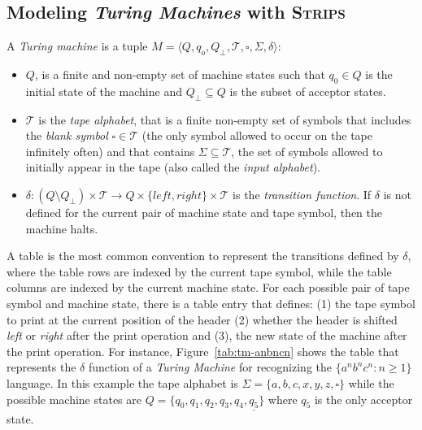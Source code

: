 \documentclass[letterpaper]{article} %
\newcommand{\tup}[1]{{\langle #1 \rangle}}
\newcommand{\strips}{\textsc{Strips}}     %
\begin{document}
\subsection{Modeling {\em Turing Machines} with \strips\ }
A {\em Turing machine} is a tuple $M=\tup{Q,q_o,Q_{\bot},\mathcal{T},\square,\Sigma,\delta}$:
\begin{itemize}
\item $Q$, is a finite and non-empty set of machine states such that $q_0\in Q$ is the initial state of the machine and $Q_{\bot}\subseteq Q$ is the subset of acceptor states.  
\item $\mathcal{T}$ is the {\em tape alphabet}, that is a finite non-empty set of symbols that includes the {\em blank symbol} $\square\in\mathcal{T}$ (the only symbol allowed to occur on the tape infinitely often) and that contains $\Sigma\subseteq\mathcal{T}$, the set of symbols allowed to initially appear in the tape (also called the {\em input alphabet}).
\item $\delta: (Q\setminus Q_{\bot})\times \mathcal{T}\rightarrow Q\times\{left,right\}\times \mathcal{T}$ is the {\em transition function}. If $\delta$ is not defined for the current pair of machine state and tape symbol, then the machine halts.
\end{itemize}

A table is the most common convention to represent the transitions defined by $\delta$, where the table rows are indexed by the current tape symbol, while the table columns are indexed by the current machine state. For each possible pair of tape symbol and machine state, there is a table entry that defines: (1) the tape symbol to print at the current position of the header (2) whether the header is shifted {\em left} or {\em right} after the print operation and (3), the new state of the machine after the print operation. For instance, Figure~\ref{tab:tm-anbncn} shows the table that represents the $\delta$ function of a {\em Turing Machine} for recognizing the $\{a^nb^nc^n : n \geq 1 \}$ language. In this example the tape alphabet is $\Sigma=\{a,b,c,x,y,z,\square\}$ while the possible machine states are $Q=\{q_0,q_1,q_2,q_3,q_4,\underline{q_5}\}$ where \underline{$q_5$} is the only acceptor state.
\end{document}
